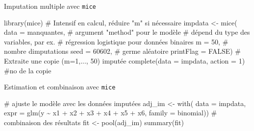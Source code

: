 \documentclass[
  ignorenonframetext,
]{beamer}
\newenvironment{Shaded}{\begin{snugshade}}{\end{snugshade}}
\newcommand{\AttributeTok}[1]{\textcolor[rgb]{0.40,0.45,0.13}{#1}}
\newcommand{\CommentTok}[1]{\textcolor[rgb]{0.37,0.37,0.37}{#1}}
\newcommand{\ConstantTok}[1]{\textcolor[rgb]{0.56,0.35,0.01}{#1}}
\newcommand{\DecValTok}[1]{\textcolor[rgb]{0.68,0.00,0.00}{#1}}
\newcommand{\FunctionTok}[1]{\textcolor[rgb]{0.28,0.35,0.67}{#1}}
\newcommand{\NormalTok}[1]{\textcolor[rgb]{0.00,0.23,0.31}{#1}}
\newcommand{\OtherTok}[1]{\textcolor[rgb]{0.00,0.23,0.31}{#1}}
\newcommand{\SpecialCharTok}[1]{\textcolor[rgb]{0.37,0.37,0.37}{#1}}
\begin{document}
\begin{frame}[fragile]{Imputation multiple avec \texttt{mice}}
\protect\hypertarget{imputation-multiple-avec-mice}{}
\begin{Shaded}
\begin{Highlighting}[numbers=left,,]
\FunctionTok{library}\NormalTok{(mice)}
\CommentTok{\# Intensif en calcul, réduire "m" si nécessaire}
\NormalTok{impdata }\OtherTok{\textless{}{-}} \FunctionTok{mice}\NormalTok{(}
   \AttributeTok{data =}\NormalTok{ manquantes,}
   \CommentTok{\# argument "method" pour le modèle}
   \CommentTok{\# dépend du type des variables, par ex.}
   \CommentTok{\# régression logistique pour données binaires}
   \AttributeTok{m =} \DecValTok{50}\NormalTok{, }\CommentTok{\# nombre d\textquotesingle{}imputations}
   \AttributeTok{seed =} \DecValTok{60602}\NormalTok{, }\CommentTok{\# germe aléatoire}
   \AttributeTok{printFlag =} \ConstantTok{FALSE}\NormalTok{)}
\CommentTok{\# Extraite une copie (m=1,..., 50) imputée }
\FunctionTok{complete}\NormalTok{(}\AttributeTok{data =}\NormalTok{ impdata, }
         \AttributeTok{action =} \DecValTok{1}\NormalTok{) }\CommentTok{\#no de la copie}
\end{Highlighting}
\end{Shaded}
\end{frame}

\begin{frame}[fragile]{Estimation et combinaison avec \texttt{mice}}
\protect\hypertarget{estimation-et-combinaison-avec-mice}{}
\begin{Shaded}
\begin{Highlighting}[numbers=left,,]
\CommentTok{\# ajuste le modèle avec les données imputées}
\NormalTok{adj\_im }\OtherTok{\textless{}{-}} \FunctionTok{with}\NormalTok{(}
  \AttributeTok{data =}\NormalTok{ impdata,}
  \AttributeTok{expr =} \FunctionTok{glm}\NormalTok{(y }\SpecialCharTok{\textasciitilde{}}\NormalTok{ x1 }\SpecialCharTok{+}\NormalTok{ x2 }\SpecialCharTok{+}\NormalTok{ x3 }\SpecialCharTok{+}\NormalTok{ x4 }\SpecialCharTok{+}\NormalTok{ x5 }\SpecialCharTok{+}\NormalTok{ x6,}
             \AttributeTok{family =}\NormalTok{ binomial))}
\CommentTok{\# combinaison des résultats }
\NormalTok{fit }\OtherTok{\textless{}{-}} \FunctionTok{pool}\NormalTok{(adj\_im)}
\FunctionTok{summary}\NormalTok{(fit)}
\end{Highlighting}
\end{Shaded}
\end{frame}
\end{document}
